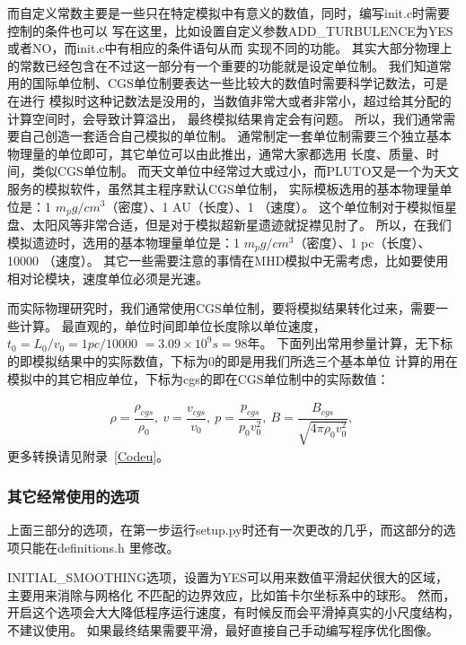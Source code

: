 而自定义常数主要是一些只在特定模拟中有意义的数值，同时，编写init.c时需要控制的条件也可以
写在这里，比如设置自定义参数ADD\_TURBULENCE为YES或者NO，而init.c中有相应的条件语句从而
实现不同的功能。
其实大部分物理上的常数已经包含在不过这一部分有一个重要的功能就是设定单位制。
我们知道常用的国际单位制、CGS单位制要表达一些比较大的数值时需要科学记数法，可是在进行
模拟时这种记数法是没用的，当数值非常大或者非常小，超过给其分配的计算空间时，会导致计算溢出，
最终模拟结果肯定会有问题。
所以，我们通常需要自己创造一套适合自己模拟的单位制。
通常制定一套单位制需要三个独立基本物理量的单位即可，其它单位可以由此推出，通常大家都选用
长度、质量、时间，类似CGS单位制。
而天文单位中经常过大或过小，而PLUTO又是一个为天文服务的模拟软件，虽然其主程序默认CGS单位制，
实际模板选用的基本物理量单位是：1 $m_p g/cm^3$（密度）、1 AU（长度）、1 \kms（速度）。
这个单位制对于模拟恒星盘、太阳风等非常合适，但是对于模拟超新星遗迹就捉襟见肘了。
所以，在我们模拟遗迹时，选用的基本物理量单位是：1 $m_p g/cm^3$（密度）、1 pc（长度）、
10000 \kms（速度）。
其它一些需要注意的事情在MHD模拟中无需考虑，比如要使用相对论模块，速度单位必须是光速。

而实际物理研究时，我们通常使用CGS单位制，要将模拟结果转化过来，需要一些计算。
最直观的，单位时间即单位长度除以单位速度，
$t_0 = L_0/v_0 = 1 pc/10000$ \kms $= 3.09\times10^9 s = 98$年。
下面列出常用参量计算，无下标的即模拟结果中的实际数值，下标为0的即是用我们所选三个基本单位
计算的用在模拟中的其它相应单位，下标为cgs的即在CGS单位制中的实际数值：

\begin{equation}
  \begin{aligned}
    \rho = \dfrac{\rho_{cgs}}{\rho_0} ,   \
    v = \dfrac{v_{cgs}}{v_0} ,   \
    p= \dfrac{p_{cgs}}{p_0v_0^2} ,   \
    B = \dfrac{B_{cgs}}{\sqrt{4\pi\rho_0v_0^2}} ,   \
  \end{aligned}
\end{equation}
更多转换请见附录~\ref{Codeu}。

\subsubsection{其它经常使用的选项}
上面三部分的选项，在第一步运行setup.py时还有一次更改的几乎，而这部分的选项只能在definitions.h
里修改。

INITIAL\_SMOOTHING选项，设置为YES可以用来数值平滑起伏很大的区域，主要用来消除与网格化
不匹配的边界效应，比如笛卡尔坐标系中的球形。
然而，开启这个选项会大大降低程序运行速度，有时候反而会平滑掉真实的小尺度结构，不建议使用。
如果最终结果需要平滑，最好直接自己手动编写程序优化图像。

